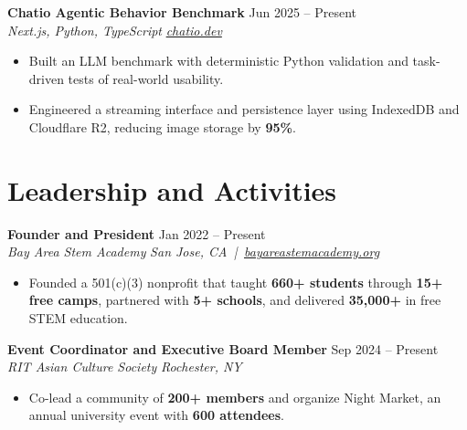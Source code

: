 \documentclass[10pt,letterpaper]{article}
\newif\ifresumeFirstRole
\newcommand{\resumeRole}[4]{%
  \ifresumeFirstRole
    \global\resumeFirstRolefalse
  \else
    \vspace{0pt plus 1fill}%
  \fi
  \textbf{#1} \hfill #2\\
  \textit{#3} \hfill \textit{#4}
}
\begin{document}
\resumeRole{Chatio Agentic Behavior Benchmark}{Jun 2025 -- Present}{Next.js, Python, TypeScript}{\href{https://chatio.dev}{chatio.dev}}
\begin{itemize}
  \item Built an LLM benchmark with deterministic Python validation and task-driven tests of real-world usability.
  \item Engineered a streaming interface and persistence layer using IndexedDB and Cloudflare R2, reducing image storage by \textbf{95\%}.
\end{itemize}

\section*{Leadership and Activities}
\resumeRole{Founder and President}{Jan 2022 -- Present}{Bay Area Stem Academy}{San Jose, CA \,|\, \href{https://bayareastemacademy.org}{bayareastemacademy.org}}
\begin{itemize}
  \item Founded a 501(c)(3) nonprofit that taught \textbf{660+ students} through \textbf{15+ free camps}, partnered with \textbf{5+ schools}, and delivered \textbf{\textdollar{}35,000+} in free STEM education.
\end{itemize}

\resumeRole{Event Coordinator and Executive Board Member}{Sep 2024 -- Present}{RIT Asian Culture Society}{Rochester, NY}
\begin{itemize}
  \item Co-lead a community of \textbf{200+ members} and organize Night Market, an annual university event with \textbf{600 attendees}.
\end{itemize}
\end{document}
